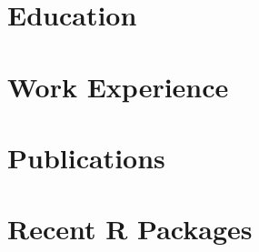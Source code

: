 \documentclass[letterpaper, 10.5pt, sans]{moderncv}
\begin{document}
\makecvtitle

\vspace*{-35pt}


\section{Education}







\vspace{-10pt}
\section{Work Experience}


\vspace{-10pt}
\vspace{-3pt}










\vspace{-5pt}


\vspace{-5pt}
\section{Publications}
\vspace{-5pt}







\newpage


\section{Recent R Packages}


\end{document}
